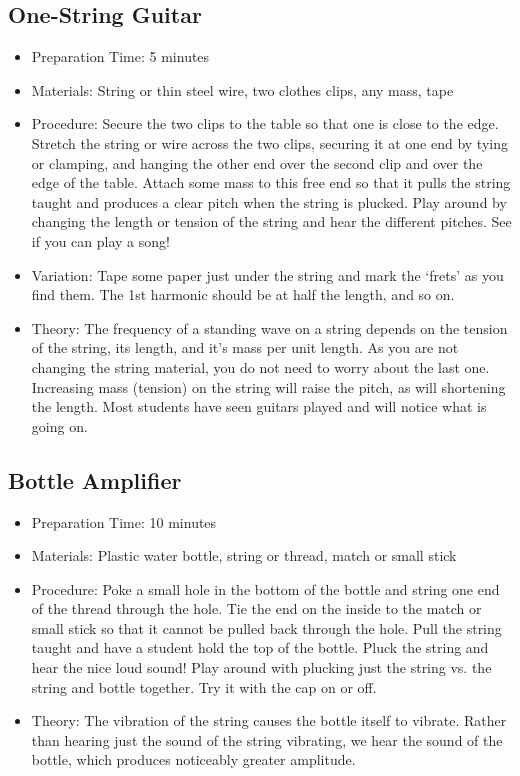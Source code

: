 \subsection{One-String Guitar}
\begin{itemize}
\item{Preparation Time: 5 minutes}
\item{Materials: String or thin steel wire, two clothes clips, any mass, tape}
\item{Procedure: Secure the two clips to the table so that one is close to the edge. Stretch the string or wire across the two clips, securing it at one end by tying or clamping, and hanging the other end over the second clip and over the edge of the table. Attach some mass to this free end so that it pulls the string taught and produces a clear pitch when the string is plucked. Play around by changing the length or tension of the string and hear the different pitches. See if you can play a song!}
\item{Variation: Tape some paper just under the string and mark the ‘frets’ as you find them. The 1st harmonic should be at half the length, and so on.}
\item{Theory: The frequency of a standing wave on a string depends on the tension of the string, its length, and it’s mass per unit length. As you are not changing the string material, you do not need to worry about the last one. Increasing mass (tension) on the string will raise the pitch, as will shortening the length. Most students have seen guitars played and will notice what is going on.}
\end{itemize}

\subsection{Bottle Amplifier}
\begin{itemize}
\item{Preparation Time: 10 minutes}
\item{Materials: Plastic water bottle, string or thread, match or small stick}
\item{Procedure: Poke a small hole in the bottom of the bottle and string one end of the thread through the hole. Tie the end on the inside to the match or small stick so that it cannot be pulled back through the hole. Pull the string taught and have a student hold the top of the bottle. Pluck the string and hear the nice loud sound! Play around with plucking just the string vs. the string and bottle together. Try it with the cap on or off.}
\item{Theory: The vibration of the string causes the bottle itself to vibrate. Rather than hearing just the sound of the string vibrating, we hear the sound of the bottle, which produces noticeably greater amplitude.}
\end{itemize}

